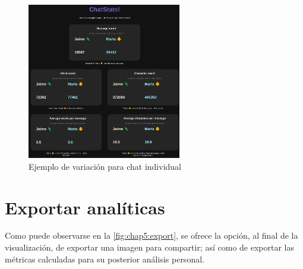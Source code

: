 \begin{figure}[h]
	\centering
	\includegraphics[width=0.6\textwidth]{img/study_case/screen_6.png}
	\caption{Ejemplo de variación para chat individual}
	\label{fig:chap5:viz_individual}
\end{figure}

\section{Exportar analíticas}

Como puede observarse en la \autoref{fig:chap5:export}, se ofrece la opción, al final de la visualización, de exportar una imagen para compartir; así como de exportar las métricas calculadas para su posterior análisis personal.


